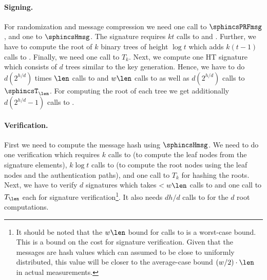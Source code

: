 \paragraph{Signing.} For randomization and message compression we need one call to
$\sphincsPRFmsg$, and one to $\sphincsHmsg$. The \fors signature requires 
$kt$ calls to \sphincsPRF and \sphincsF. Further, we have to compute the root of 
$k$ binary trees of height $\log t$ which adds $k(t - 1)$ calls to \sphincsH. 
Finally, we need one call to $T_k$. Next, we compute one HT signature which 
consists of $d$ trees similar to the key generation. Hence, we have to do 
$d(2^{h/d})$ times $\len$ calls to \sphincsPRF and $w\len$ calls to \sphincsF
as well as $d(2^{h/d})$ calls to $\sphincsT_\len$. For computing 
the root of each tree we get additionally $d(2^{h/d} - 1)$ calls to \sphincsH.

\paragraph{Verification.} First we need to compute the message hash using 
$\sphincsHmsg$. We need to do one \fors verification which requires
$k$ calls to %
\sphincsF (to compute the leaf nodes from the signature elements), $k\log t$ calls to \sphincsH (to compute the root nodes using the leaf nodes and the authentication paths), and one call
to $T_k$ for hashing the roots. Next, we have to verify $d$ \xmss signatures 
which takes $<w\len$ calls to \sphincsF and one call to $T_\len$ each for \wotsp
signature verification\footnote{It should be noted that the $w\len$ bound for calls to \sphincsF is a worst-case bound. This is a bound on the cost for \wots signature verification. Given that the messages are hash values which can assumed to be close to uniformly distributed, this value will be closer to the average-case bound $(w/2) \cdot \len$ in actual measurements.}. It also needs $dh/d$ calls to \sphincsH for the $d$ 
root computations.

